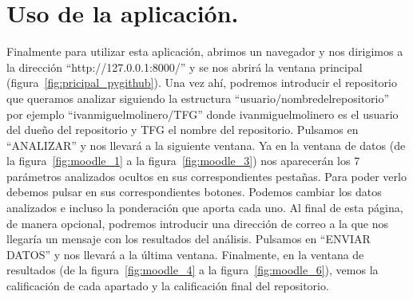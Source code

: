 \documentclass[a4paper, 12pt]{book}
\begin{document}
\section{Uso de la aplicación.}
Finalmente para utilizar esta aplicación, abrimos un navegador y nos dirigimos a la dirección ``http://127.0.0.1:8000/'' y se nos abrirá la ventana principal (figura~\ref{fig:pricipal_pygithub}).
Una vez ahí, podremos introducir el repositorio que queramos analizar siguiendo la estructura ``usuario/nombre\textunderscore del\textunderscore repositorio'' por ejemplo ``ivanmiguelmolinero/TFG'' donde ivanmiguelmolinero es el usuario del dueño del repositorio y TFG el nombre del repositorio. Pulsamos en ``ANALIZAR'' y nos llevará a la siguiente ventana.
Ya en la ventana de datos (de la figura~\ref{fig:moodle_1} a la figura~\ref{fig:moodle_3}) nos aparecerán los 7 parámetros analizados ocultos en sus correspondientes pestañas. Para poder verlo debemos pulsar en sus correspondientes botones. Podemos cambiar los datos analizados e incluso la ponderación que aporta cada uno. Al final de esta página, de manera opcional, podremos introducir una dirección de correo a la que nos llegaría un mensaje con los resultados del análisis. Pulsamos en ``ENVIAR DATOS'' y nos llevará a la última ventana.
Finalmente, en la ventana de resultados (de la figura~\ref{fig:moodle_4} a la figura~\ref{fig:moodle_6}), vemos la calificación de cada apartado y la calificación final del repositorio.
\cleardoublepage

\end{document}
